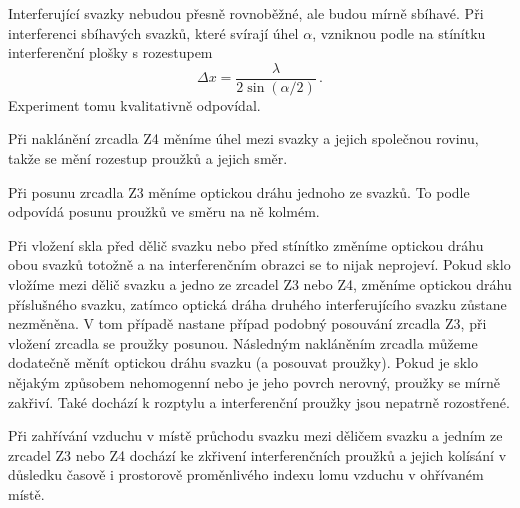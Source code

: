 Interferující svazky nebudou přesně rovnoběžné, ale budou mírně sbíhavé. Při interferenci sbíhavých svazků, které svírají úhel $\alpha$, vzniknou podle \cite{skripta} na stínítku interferenční plošky s rozestupem
\begin{equation}
\Delta x=\frac{\lambda}{2 \sin(\alpha/2)} \,.
\end{equation}
Experiment tomu kvalitativně odpovídal.


Při naklánění zrcadla Z4 měníme úhel mezi svazky a jejich společnou rovinu, takže se mění rozestup proužků a jejich směr.


Při posunu zrcadla Z3 měníme optickou dráhu jednoho ze svazků.
To podle \cite{skripta} odpovídá posunu proužků ve směru na ně kolmém.


Při vložení skla před dělič svazku nebo před stínítko změníme optickou dráhu obou svazků totožně a na interferenčním obrazci se to nijak neprojeví. Pokud sklo vložíme mezi dělič svazku a jedno ze zrcadel Z3 nebo Z4, změníme optickou dráhu příslušného svazku, zatímco optická dráha druhého interferujícího svazku zůstane nezměněna. V tom případě nastane případ podobný posouvání zrcadla Z3, při vložení zrcadla se proužky posunou. Následným nakláněním zrcadla můžeme dodatečně měnít optickou dráhu svazku (a posouvat proužky). Pokud je sklo nějakým způsobem nehomogenní nebo je jeho povrch nerovný, proužky se mírně zakřiví. Také dochází k rozptylu a interferenční proužky jsou nepatrně rozostřené.


Při zahřívání vzduchu v místě průchodu svazku mezi děličem svazku a jedním ze zrcadel Z3 nebo Z4 dochází ke zkřivení interferenčních proužků a jejich kolísání v důsledku časově i prostorově proměnlivého indexu lomu vzduchu v ohřívaném místě.